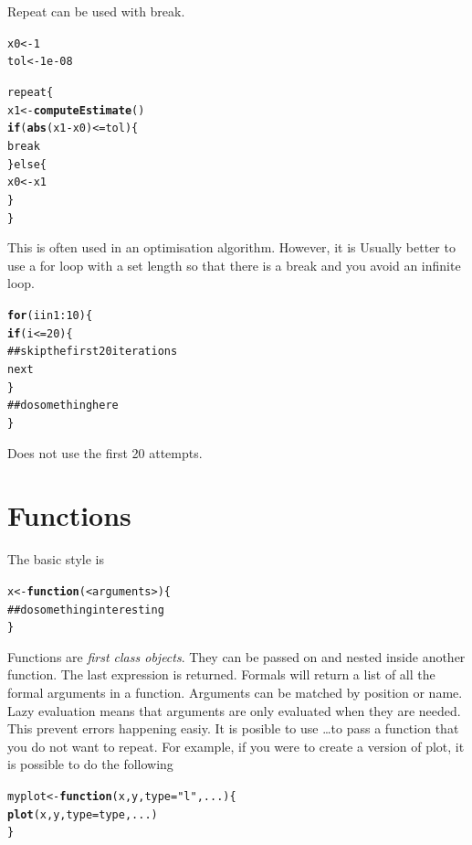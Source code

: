 \documentclass{article}\usepackage{graphicx, color}
\makeatletter
\newcommand{\hlfunctioncall}[1]{\textcolor[rgb]{0.501960784313725,0,0.329411764705882}{\textbf{#1}}}%
\newcommand{\hlstring}[1]{\textcolor[rgb]{0.6,0.6,1}{#1}}%
\newcommand{\hlcomment}[1]{\textcolor[rgb]{0.180392156862745,0.6,0.341176470588235}{#1}}%
\newenvironment{kframe}{%
 \def\at@end@of@kframe{}%
 \ifinner\ifhmode%
  \def\at@end@of@kframe{\end{minipage}}%
  \begin{minipage}{\columnwidth}%
 \fi\fi%
 \def\FrameCommand##1{\hskip\@totalleftmargin \hskip-\fboxsep
 \colorbox{shadecolor}{##1}\hskip-\fboxsep
     \hskip-\linewidth \hskip-\@totalleftmargin \hskip\columnwidth}%
 \MakeFramed {\advance\hsize-\width
   \@totalleftmargin\z@ \linewidth\hsize
   \@setminipage}}%
 {\par\unskip\endMakeFramed%
 \at@end@of@kframe}
\newenvironment{knitrout}{}{} %
\makeatother
\begin{document}
Repeat can be used with break. 
\begin{knitrout}
\color{fgcolor}\begin{kframe}
\begin{alltt}
x0 <- 1
tol <- 1e-08

repeat \{
    x1 <- \hlfunctioncall{computeEstimate}()
    \hlfunctioncall{if} (\hlfunctioncall{abs}(x1 - x0) <= tol) \{
        break
    \} else \{
        x0 <- x1
    \}
\}
\end{alltt}
\end{kframe}
\end{knitrout}

This is often used in an optimisation algorithm. However, it is Usually better to use a for loop with a set length so that there is a break and you avoid an infinite loop. 
\begin{knitrout}
\color{fgcolor}\begin{kframe}
\begin{alltt}
\hlfunctioncall{for} (i in 1:10) \{
    \hlfunctioncall{if} (i <= 20) \{
\hlcomment{        ## skip the first 20 iterations}
        next
    \}
\hlcomment{    ## do something here}
\}
\end{alltt}
\end{kframe}
\end{knitrout}

Does not use the first 20 attempts. 

\section{Functions}
The basic style is 
\begin{knitrout}
\color{fgcolor}\begin{kframe}
\begin{alltt}
x <- \hlfunctioncall{function}(<arguments>)\{
\hlcomment{  ## do something interesting}
\}
\end{alltt}
\end{kframe}
\end{knitrout}

Functions are \emph{first class objects}.  They can be passed on and nested inside another function.  The last expression is returned.  Formals will return a list of all the formal arguments in a function. Arguments can be matched by position or name. Lazy evaluation means that arguments are only evaluated when they are needed. This prevent errors happening easiy. It is posible to use \dots to pass a function that you do not want to repeat.  For example, if you were to create a version of plot, it is possible to do the following
\begin{knitrout}
\color{fgcolor}\begin{kframe}
\begin{alltt}
myplot <- \hlfunctioncall{function}(x, y, type = \hlstring{"l"}, ...) \{
    \hlfunctioncall{plot}(x, y, type = type, ...)
\}
\end{alltt}
\end{kframe}
\end{knitrout}
\end{document}
